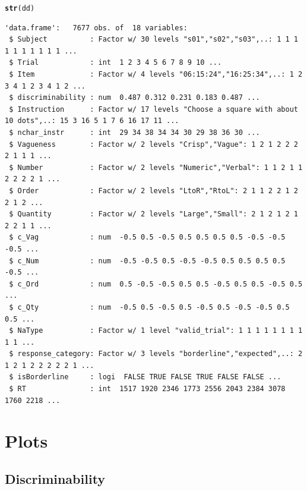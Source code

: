 \documentclass[a4paper,12pt,twoside]{article}\usepackage[]{graphicx}\usepackage[]{color}
\makeatletter
\newcommand{\hlstd}[1]{\textcolor[rgb]{0.345,0.345,0.345}{#1}}%
\newcommand{\hlkwd}[1]{\textcolor[rgb]{0.737,0.353,0.396}{\textbf{#1}}}%
\newenvironment{kframe}{%
 \def\at@end@of@kframe{}%
 \ifinner\ifhmode%
  \def\at@end@of@kframe{\end{minipage}}%
  \begin{minipage}{\columnwidth}%
 \fi\fi%
 \def\FrameCommand##1{\hskip\@totalleftmargin \hskip-\fboxsep
 \colorbox{shadecolor}{##1}\hskip-\fboxsep
     \hskip-\linewidth \hskip-\@totalleftmargin \hskip\columnwidth}%
 \MakeFramed {\advance\hsize-\width
   \@totalleftmargin\z@ \linewidth\hsize
   \@setminipage}}%
 {\par\unskip\endMakeFramed%
 \at@end@of@kframe}
\newenvironment{knitrout}{}{} %
\makeatother
\begin{document}
\clearpage

\begin{knitrout}\scriptsize
{}\color{fgcolor}\begin{kframe}
\begin{alltt}
\hlkwd{str}\hlstd{(dd)}
\end{alltt}
\begin{verbatim}
'data.frame':	7677 obs. of  18 variables:
 $ Subject          : Factor w/ 30 levels "s01","s02","s03",..: 1 1 1 1 1 1 1 1 1 1 ...
 $ Trial            : int  1 2 3 4 5 6 7 8 9 10 ...
 $ Item             : Factor w/ 4 levels "06:15:24","16:25:34",..: 1 2 3 4 1 2 3 4 1 2 ...
 $ discriminability : num  0.487 0.312 0.231 0.183 0.487 ...
 $ Instruction      : Factor w/ 17 levels "Choose a square with about 10 dots",..: 15 3 16 5 1 7 6 16 17 11 ...
 $ nchar_instr      : int  29 34 38 34 34 30 29 38 36 30 ...
 $ Vagueness        : Factor w/ 2 levels "Crisp","Vague": 1 2 1 2 2 2 2 1 1 1 ...
 $ Number           : Factor w/ 2 levels "Numeric","Verbal": 1 1 2 1 1 2 2 2 2 1 ...
 $ Order            : Factor w/ 2 levels "LtoR","RtoL": 2 1 1 2 2 1 2 2 1 2 ...
 $ Quantity         : Factor w/ 2 levels "Large","Small": 2 1 2 1 2 1 2 2 1 1 ...
 $ c_Vag            : num  -0.5 0.5 -0.5 0.5 0.5 0.5 0.5 -0.5 -0.5 -0.5 ...
 $ c_Num            : num  -0.5 -0.5 0.5 -0.5 -0.5 0.5 0.5 0.5 0.5 -0.5 ...
 $ c_Ord            : num  0.5 -0.5 -0.5 0.5 0.5 -0.5 0.5 0.5 -0.5 0.5 ...
 $ c_Qty            : num  -0.5 0.5 -0.5 0.5 -0.5 0.5 -0.5 -0.5 0.5 0.5 ...
 $ NaType           : Factor w/ 1 level "valid_trial": 1 1 1 1 1 1 1 1 1 1 ...
 $ response_category: Factor w/ 3 levels "borderline","expected",..: 2 1 2 1 2 2 2 2 2 1 ...
 $ isBorderline     : logi  FALSE TRUE FALSE TRUE FALSE FALSE ...
 $ RT               : int  1517 1920 2346 1773 2556 2043 2384 3078 1760 2218 ...
\end{verbatim}
\end{kframe}
\end{knitrout}

\clearpage
\section{Plots}
\clearpage
\subsection{Discriminability}
\end{document}
